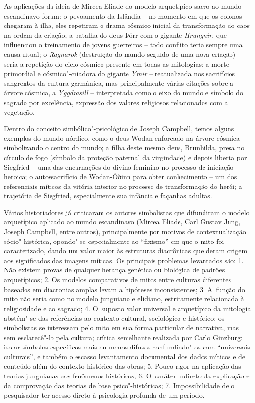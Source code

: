 As aplicações da ideia de Mircea Eliade do modelo arquetípico sacro ao
mundo escandinavo foram: o povoamento da Islândia -- no momento em que
os colonos chegaram à ilha, eles repetiram o drama cósmico inicial da
transformação do caos na ordem da criação; a batalha do deus Þórr com o
gigante \emph{Hrungnir}, que influenciou o treinamento de jovens
guerreiros -- todo conflito teria sempre uma causa ritual; o
\emph{Ragnarok} (destruição do mundo seguido de uma nova criação) seria
a repetição do ciclo cósmico presente em todas as mitologias; a morte
primordial e cósmico"-criadora do gigante \emph{Ymir} -- reatualizada nos
sacrifícios sangrentos da cultura germânica, mas principalmente várias
citações sobre a árvore cósmica, a \emph{Yggdrasill} -- interpretada
como o eixo do mundo e símbolo do sagrado por excelência, expressão dos
valores religiosos relacionados com a vegetação.

Dentro do conceito simbólico"-psicológico de Joseph Campbell, temos
alguns exemplos do mundo nórdico, como o deus Wodan enforcado na árvore
cósmica -- simbolizando o centro do mundo; a filha deste mesmo deus,
Brunhilda, presa no círculo de fogo (símbolo da proteção paternal da
virgindade) e depois liberta por Siegfried -- uma das encarnações do
divino feminino no processo de iniciação heroica; o autossacrifício de
Wodan-Óðinn para obter conhecimento -- um dos referenciais míticos da
vitória interior no processo de transformação do herói; a trajetória de
Siegfried, especialmente sua infância e façanhas adultas.

Vários historiadores já criticaram os autores simbolistas que difundiram
o modelo arquetípico aplicado ao mundo escandinavo (Mircea Eliade, Carl
Gustav Jung, Joseph Campbell, entre outros), principalmente por motivos
de contextualização sócio"-histórica, opondo"-se especialmente ao
``fixismo'' em que o mito foi caracterizado, dando um valor maior às
estruturas diacrônicas que deram origem aos significados das imagens
míticas. Os principais problemas levantados são: 1. Não existem provas
de qualquer herança genética ou biológica de padrões arquetípicos; 2. Os
modelos comparativos de mitos entre culturas diferentes baseados em
diacronias amplas levam a hipóteses inconsistentes; 3. A~função do mito
não seria como no modelo junguiano e elidiano, estritamente relacionada
à religiosidade e ao sagrado; 4. O~suposto valor universal e arquetípico
da mitologia abstém"-se das referências ao contexto cultural, sociológico
e histórico: os simbolistas se interessam pelo mito em sua forma
particular de narrativa, mas sem esclarecê"-lo pela cultura; crítica
semelhante realizada por Carlo Ginzburg: isolar símbolos específicos
mais ou menos difusos confundindo"-os com ``universais culturais'', e
também o escasso levantamento documental dos dados míticos e de conteúdo
além do contexto histórico das obras; 5. Pouco rigor na aplicação das
teorias junguianas aos fenômenos históricos; 6. O~caráter indireto da
explicação e da comprovação das teorias de base psico"-históricas; 7.
Impossibilidade de o pesquisador ter acesso direto à psicologia profunda
de um período.

